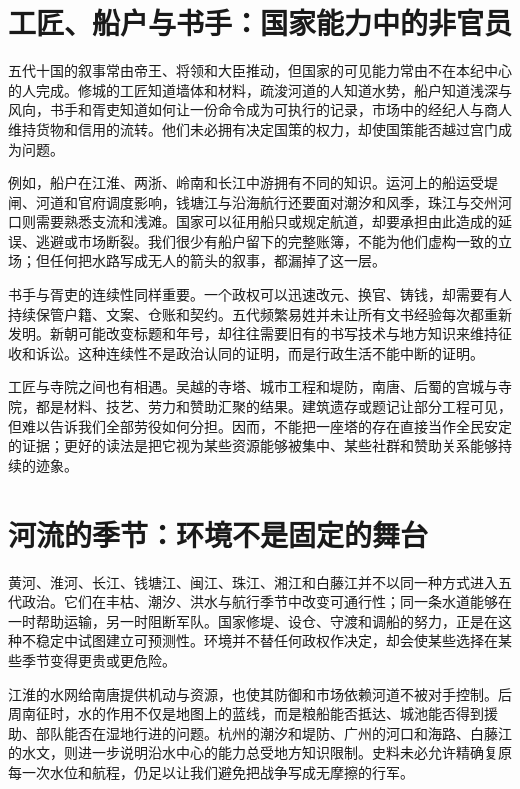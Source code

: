 \section{工匠、船户与书手：国家能力中的非官员}

五代十国的叙事常由帝王、将领和大臣推动，但国家的可见能力常由不在本纪中心的人完成。修城的工匠知道墙体和材料，疏浚河道的人知道水势，船户知道浅深与风向，书手和胥吏知道如何让一份命令成为可执行的记录，市场中的经纪人与商人维持货物和信用的流转。他们未必拥有决定国策的权力，却使国策能否越过宫门成为问题。

例如，船户在江淮、两浙、岭南和长江中游拥有不同的知识。运河上的船运受堤闸、河道和官府调度影响，钱塘江与沿海航行还要面对潮汐和风季，珠江与交州河口则需要熟悉支流和浅滩。国家可以征用船只或规定航道，却要承担由此造成的延误、逃避或市场断裂。我们很少有船户留下的完整账簿，不能为他们虚构一致的立场；但任何把水路写成无人的箭头的叙事，都漏掉了这一层。

书手与胥吏的连续性同样重要。一个政权可以迅速改元、换官、铸钱，却需要有人持续保管户籍、文案、仓账和契约。五代频繁易姓并未让所有文书经验每次都重新发明。新朝可能改变标题和年号，却往往需要旧有的书写技术与地方知识来维持征收和诉讼。这种连续性不是政治认同的证明，而是行政生活不能中断的证明。

工匠与寺院之间也有相遇。吴越的寺塔、城市工程和堤防，南唐、后蜀的宫城与寺院，都是材料、技艺、劳力和赞助汇聚的结果。建筑遗存或题记让部分工程可见，但难以告诉我们全部劳役如何分担。因而，不能把一座塔的存在直接当作全民安定的证据；更好的读法是把它视为某些资源能够被集中、某些社群和赞助关系能够持续的迹象。

\section{河流的季节：环境不是固定的舞台}

黄河、淮河、长江、钱塘江、闽江、珠江、湘江和白藤江并不以同一种方式进入五代政治。它们在丰枯、潮汐、洪水与航行季节中改变可通行性；同一条水道能够在一时帮助运输，另一时阻断军队。国家修堤、设仓、守渡和调船的努力，正是在这种不稳定中试图建立可预测性。环境并不替任何政权作决定，却会使某些选择在某些季节变得更贵或更危险。

江淮的水网给南唐提供机动与资源，也使其防御和市场依赖河道不被对手控制。后周南征时，水的作用不仅是地图上的蓝线，而是粮船能否抵达、城池能否得到援助、部队能否在湿地行进的问题。杭州的潮汐和堤防、广州的河口和海路、白藤江的水文，则进一步说明沿水中心的能力总受地方知识限制。史料未必允许精确复原每一次水位和航程，仍足以让我们避免把战争写成无摩擦的行军。

